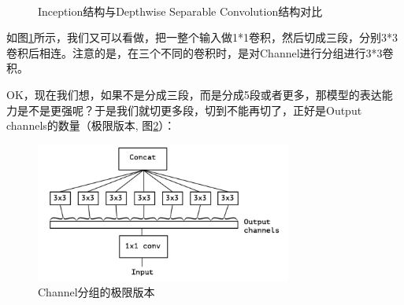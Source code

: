 \begin{figure}[!htbp]
\centering
{}
\\
\caption{Inception结构与Depthwise Separable Convolution结构对比}
\label{InceptionAndDepthwise0}
\end{figure}

如图\ref{InceptionAndDepthwise0}所示，我们又可以看做，把一整个输入做1*1卷积，然后切成三段，分别3*3卷积后相连。注意的是，在三个不同的卷积时，是对Channel进行分组进行3*3卷积。

OK，现在我们想，如果不是分成三段，而是分成5段或者更多，那模型的表达能力是不是更强呢？于是我们就切更多段，切到不能再切了，正好是Output channels的数量（极限版本, 图\ref{DepthwiseSeparable1}）：

\begin{figure}[!htbp]
\centering
\includegraphics[width=0.75\textwidth]{DLTips/DepthwiseSeparable1.jpg}
\caption{Channel分组的极限版本}
\label{DepthwiseSeparable1}
\end{figure}

